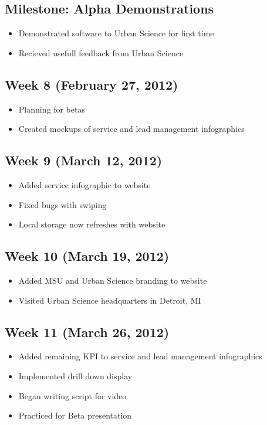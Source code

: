 \documentclass[11pt,a4paper,oneside]{article}
\begin{document}
\subsection{Milestone: Alpha Demonstrations}
\begin{itemize}
\item Demonstrated software to Urban Science for first time
\item Recieved usefull feedback from Urban Science
\end{itemize}

\subsection{Week 8 (February 27, 2012)}
\begin{itemize}
\item Planning for betas
\item Created mockups of service and lead management infographics
\end{itemize}

\subsection{Week 9 (March 12, 2012)}
\begin{itemize}
\item Added service infographic to website
\item Fixed bugs with swiping
\item Local storage now refreshes with website
\end{itemize}

\subsection{Week 10 (March 19, 2012)}
\begin{itemize}
\item Added MSU and Urban Science branding to website
\item Visited Urban Science headquarters in Detroit, MI
\end{itemize}

\subsection{Week 11 (March 26, 2012)}
\begin{itemize}
\item Added remaining KPI to service and lead management infographics
\item Implemented drill down display
\item Began writing script for video
\item Practiced for Beta presentation
\end{itemize}
\end{document}

